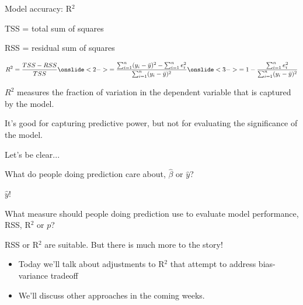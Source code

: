 \documentclass[aspectratio=169]{beamer}
\begin{document}
\begin{frame}{Model accuracy: R$^2$}

TSS = total sum of squares

\vspace{3mm}

RSS = residual sum of squares

  \begin{align*}
    R^2 = \frac{TSS - RSS}{TSS} \onslide<2->{= \frac{\sum_{i=1}^n (y_i-\bar{y})^2 - \sum_{i=1}^n e_i^2}{\sum_{i=1}^n (y_i-\bar{y})^2}}\onslide<3->{ = 1-\frac{\sum_{i=1}^n e_i^2}{\sum_{i=1}^n (y_i-\bar{y})^2} }
  \end{align*}

  \pause\pause
  $R^2$ measures the fraction of variation in the dependent variable that is captured by the model.  

\pause
\vspace{5mm}

It's good for capturing predictive power, but not for evaluating the significance of the model.

\end{frame}


\begin{frame}{Let's be clear...}

What do people doing prediction care about, $\hat{\beta}$ or $\hat{y}$?

\vspace{5mm}
\pause

$\hat{y}$!

\vspace{5mm}
\pause

What measure should people doing prediction use to evaluate model performance, RSS, R$^2$ or $p$?

\vspace{5mm}
\pause

RSS or R$^2$ are suitable.  But there is much more to the story! 
\begin{itemize}
  \item Today we'll talk about adjustments to R$^2$ that attempt to address bias-variance tradeoff
  \item  We'll discuss other approaches in the coming weeks.
\end{itemize}

\end{frame}
\end{document}
